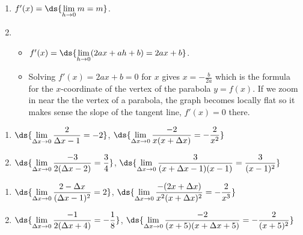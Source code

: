 \documentclass{ximera}
\begin{document}
\begin{enumerate}
\setcounter{enumi}{\value{HW}}

\item  $f'(x) = \ds{\lim_{h \rightarrow 0} m= m}$.

\item  \begin{itemize} \item  $f'(x) = \ds{\lim_{h \rightarrow 0} (2ax + ah + b) = 2ax + b}$.

\smallskip

\item  Solving $f'(x) = 2ax + b = 0$ for $x$ gives $x = -\frac{b}{2a}$ which is the formula for the $x$-coordinate of the vertex of the parabola $y = f(x)$.  If we zoom in near the the vertex of a parabola, the graph becomes locally flat so it makes sense the slope of the tangent line,  $f'(x) = 0$ there. 

\end{itemize} 

\setcounter{HW}{\value{enumi}}
\end{enumerate}

\begin{enumerate}
\setcounter{enumi}{\value{HW}}

\item  $\ds{ \lim_{\Delta x \rightarrow 0} \dfrac{2}{\Delta x-1} = -2}$,   $\ds{ \lim_{\Delta x \rightarrow 0} \dfrac{-2}{x(x+\Delta x)} = - \dfrac{2}{x^2}}$
 
\item  $\ds{ \lim_{\Delta x \rightarrow 0} \dfrac{-3}{2(\Delta x - 2)} = \dfrac{3}{4}}$,   $\ds{ \lim_{\Delta x \rightarrow 0} \dfrac{3}{(x+\Delta x-1)(x-1)} =  \dfrac{3}{(x-1)^2}}$  

\setcounter{HW}{\value{enumi}}
\end{enumerate}

\begin{enumerate}
\setcounter{enumi}{\value{HW}}

\item   $\ds{ \lim_{\Delta x \rightarrow 0} \dfrac{2-\Delta x}{(\Delta x - 1)^2} =2}$,   $\ds{ \lim_{\Delta x \rightarrow 0}\dfrac{-(2x+\Delta x)}{x^2(x+\Delta x)^2} =  - \dfrac{2}{x^3}}$   

\item    $\ds{ \lim_{\Delta x \rightarrow 0} \dfrac{-1}{2(\Delta x+4)} = - \dfrac{1}{8}}$,   $\ds{ \lim_{\Delta x \rightarrow 0} \dfrac{-2}{(x+5)(x+\Delta x+5)}=  - \dfrac{2}{(x+5)^2}}$    

\setcounter{HW}{\value{enumi}}
\end{enumerate}
\end{document}
